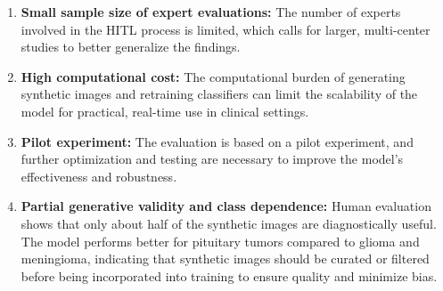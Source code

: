 \begin{enumerate}
\begin{enumerate}
        
        \item \textbf{Small sample size of expert evaluations:} The number of experts involved in the HITL process is limited, which calls for larger, multi-center studies to better generalize the findings.

        
        \item \textbf{High computational cost:} The computational burden of generating synthetic images and retraining classifiers can limit the scalability of the model for practical, real-time use in clinical settings.

        
        \item \textbf{Pilot experiment:} The evaluation is based on a pilot experiment, and further optimization and testing are necessary to improve the model’s effectiveness and robustness.

        
        \item \textbf{Partial generative validity and class dependence:} Human evaluation shows that only about half of the synthetic images are diagnostically useful. The model performs better for pituitary tumors compared to glioma and meningioma, indicating that synthetic images should be curated or filtered before being incorporated into training to ensure quality and minimize bias.
    \end{enumerate}
\end{enumerate}
